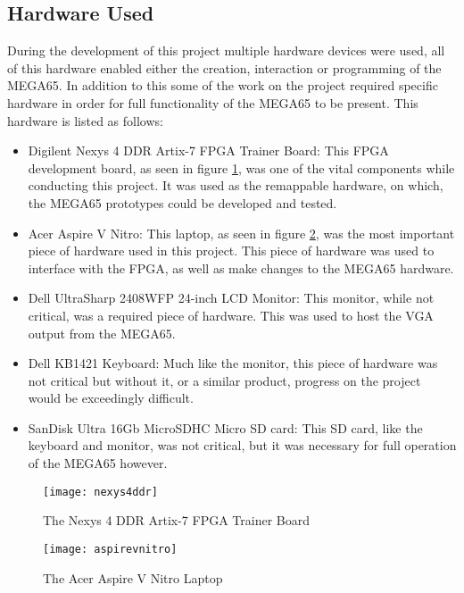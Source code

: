 \label{Ch3 Sec2}

\subsection{Hardware Used}

\label{Ch3 Sec2 Sub1}

During the development of this project multiple hardware devices were used, all of this hardware enabled either the creation, interaction or programming of the MEGA65. In addition to this some of the work on the project required specific hardware in order for full functionality of the MEGA65 to be present. This hardware is listed as follows:\\

\begin{itemize}
\item{Digilent Nexys 4 DDR Artix-7 FPGA Trainer Board: This FPGA development board, as seen in figure \ref{fig:nexys4ddr}, was one of the vital components while conducting this project. It was used as the remappable hardware, on which, the MEGA65 prototypes could be developed and tested.}
\item{Acer Aspire V Nitro: This laptop, as seen in figure \ref{fig:aspirevnitro}, was the most important piece of hardware used in this project. This piece of hardware was used to interface with the FPGA, as well as make changes to the MEGA65 hardware.}
\item{Dell UltraSharp 2408WFP 24-inch LCD Monitor: This monitor, while not critical, was a required piece of hardware. This was used to host the VGA output from the MEGA65.}
\item{Dell KB1421 Keyboard: Much like the monitor, this piece of hardware was not critical but without it, or a similar product, progress on the project would be exceedingly difficult.}
\item{SanDisk Ultra 16Gb MicroSDHC Micro SD card: This SD card, like the keyboard and monitor, was not critical, but it was necessary for full operation of the MEGA65 however.}
\end{itemize}

\begin{figure}
  \centering
  \texttt{[image: nexys4ddr]}
  \caption{The Nexys 4 DDR Artix-7 FPGA Trainer Board}
  \label{fig:nexys4ddr}
\end{figure}

\begin{figure}
  \centering
  \texttt{[image: aspirevnitro]}
  \caption{The Acer Aspire V Nitro Laptop}
  \label{fig:aspirevnitro}
\end{figure}

